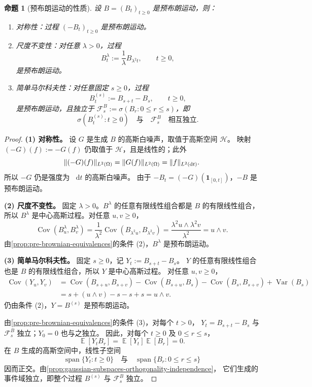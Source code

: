 \documentclass[UTF8,11pt,a4paper,oneside,fontset=fandol]{ctexrep}
\numberwithin{equation}{section}
\theoremstyle{plain}
\newtheorem{proposition}[theorem]{命题}
\theoremstyle{definition}
\theoremstyle{remark}
\newcommand{\F}{\mathcal{F}}
\newcommand{\Hcal}{\mathcal{H}}
\DeclareMathOperator{\E}{\mathbb{E}}
\DeclareMathOperator{\Var}{Var}
\DeclareMathOperator{\Cov}{Cov}
\newcommand{\ind}[1]{\mathbf{1}_{#1}}
\newcommand{\dd}{\mathop{}\!\mathrm{d}}
\DeclarePairedDelimiter{\norm}{\lVert}{\rVert}
\begin{document}
\begin{proposition}[预布朗运动的性质]
\label{prop:pre-brownian-invariances}
设 $B=(B_t)_{t\ge0}$ 是预布朗运动，则：
\begin{enumerate}[label=(\arabic*)]
  \item \textup{对称性：}过程 $(-B_t)_{t\ge0}$ 是预布朗运动。
  \item \textup{尺度不变性：}对任意 $\lambda>0$，过程
    \[
      B_t^\lambda:=\frac1\lambda B_{\lambda^2t},\qquad t\ge0,
    \]
    是预布朗运动。
  \item \textup{简单马尔科夫性：}对任意固定 $s\ge0$，过程
    \[
      B_t^{(s)}:=B_{s+t}-B_s,\qquad t\ge0,
    \]
    是预布朗运动，且独立于 $\F_s^B:=\sigma(B_r:0\le r\le s)$，即
    \[
      \sigma(B_t^{(s)}:t\ge0)\quad\text{与}\quad\F_s^B
      \quad\text{相互独立}.
    \]
\end{enumerate}
\end{proposition}

\begin{proof}
\textbf{(1) 对称性。}
设 $G$ 是生成 $B$ 的高斯白噪声，取值于高斯空间 $\Hcal$。
映射 $(-G)(f):=-G(f)$ 仍取值于 $\Hcal$，且是线性的；此外
\[
  \norm{(-G)(f)}_{L^2(\Omega)}
  =\norm{G(f)}_{L^2(\Omega)}=\norm{f}_{L^2(\dd t)}.
\]
所以 $-G$ 仍是强度为 $\dd t$ 的高斯白噪声。
由于 $-B_t=(-G)(\ind{[0,t]})$，$-B$ 是预布朗运动。

\textbf{(2) 尺度不变性。}
固定 $\lambda>0$。$B^\lambda$ 的任意有限线性组合都是 $B$ 的有限线性组合，
所以 $B^\lambda$ 是中心高斯过程。对任意 $u,v\ge0$，
\[
  \Cov(B_u^\lambda,B_v^\lambda)
  =\frac1{\lambda^2}\Cov(B_{\lambda^2u},B_{\lambda^2v})
  =\frac{\lambda^2u\wedge\lambda^2v}{\lambda^2}
  =u\wedge v.
\]
由\cref{prop:pre-brownian-equivalences}的条件 (2)，$B^\lambda$ 是预布朗运动。

\textbf{(3) 简单马尔科夫性。}
固定 $s\ge0$，记 $Y_t:=B_{s+t}-B_s$。
$Y$ 的任意有限线性组合也是 $B$ 的有限线性组合，所以 $Y$ 是中心高斯过程。
对任意 $u,v\ge0$，
\begin{align*}
  \Cov(Y_u,Y_v)
  &=\Cov(B_{s+u},B_{s+v})-\Cov(B_{s+u},B_s)
    -\Cov(B_s,B_{s+v})+\Var(B_s)\\
  &=s+(u\wedge v)-s-s+s=u\wedge v.
\end{align*}
仍由条件 (2)，$Y=B^{(s)}$ 是预布朗运动。

由\cref{prop:pre-brownian-equivalences}的条件 (3)，对每个 $t>0$，
$Y_t=B_{s+t}-B_s$ 与 $\F_s^B$ 独立；$Y_0=0$ 也与之独立。
因此，对每个 $t\ge0$ 及 $0\le r\le s$，
\[
  \E[Y_tB_r]=\E[Y_t]\E[B_r]=0.
\]
在 $B$ 生成的高斯空间中，线性子空间
\[
  \operatorname{span}\{Y_t:t\ge0\}
  \quad\text{与}\quad
  \operatorname{span}\{B_r:0\le r\le s\}
\]
因而正交。由\cref{prop:gaussian-subspaces-orthogonality-independence}，
它们生成的事件域独立，即整个过程 $B^{(s)}$ 与 $\F_s^B$ 独立。
\end{proof}
\end{document}
